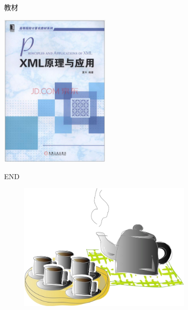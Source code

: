 \begin{frame}[fragile]{ 教材}
\begin{center}
   \includegraphics[width=0.4\textwidth]{figure/book-cover.png}
\end{center}
\end{frame}


\begin{frame}
\begin{center}
    \Huge END
\end{center}
\begin{figure}
    \includegraphics[width=0.75\textwidth]{figure/relax.png}
\end{figure}
\end{frame}
